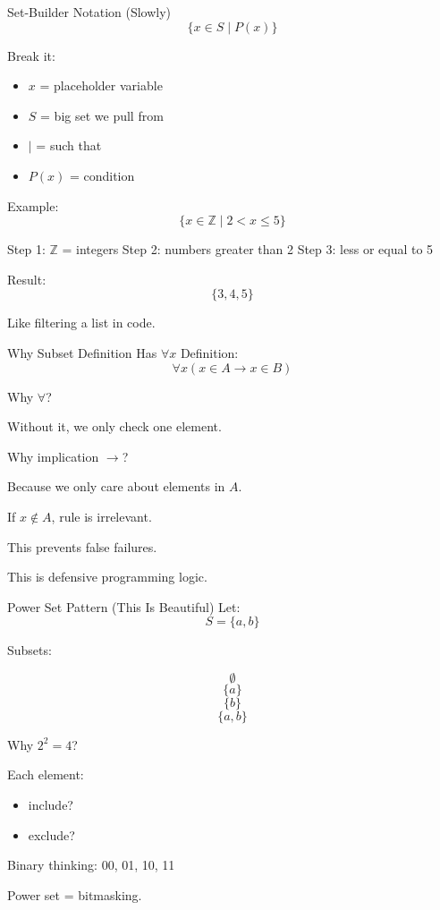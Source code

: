 \documentclass[landscape]{beamer}
\begin{document}
\begin{frame}{Set-Builder Notation (Slowly)}
\[
\{x \in S \mid P(x)\}
\]

Break it:

\begin{itemize}
\item $x$ = placeholder variable
\item $S$ = big set we pull from
\item $\mid$ = such that
\item $P(x)$ = condition
\end{itemize}

Example:
\[
\{x \in \mathbb{Z} \mid 2 < x \le 5\}
\]

Step 1: $\mathbb{Z}$ = integers  
Step 2: numbers greater than 2  
Step 3: less or equal to 5  

Result:
\[
\{3,4,5\}
\]

Like filtering a list in code.
\end{frame}

\begin{frame}{Why Subset Definition Has $\forall x$}
Definition:
\[
\forall x (x \in A \rightarrow x \in B)
\]

Why $\forall$?

Without it, we only check one element.

Why implication $\rightarrow$?

Because we only care about elements in $A$.

If $x \notin A$, rule is irrelevant.

This prevents false failures.

This is defensive programming logic.
\end{frame}

\begin{frame}{Power Set Pattern (This Is Beautiful)}
Let:
\[
S = \{a,b\}
\]

Subsets:

\[
\emptyset
\]
\[
\{a\}
\]
\[
\{b\}
\]
\[
\{a,b\}
\]

Why $2^2 = 4$?

Each element:
\begin{itemize}
\item include?
\item exclude?
\end{itemize}

Binary thinking:
00, 01, 10, 11

Power set = bitmasking.
\end{frame}
\end{document}
